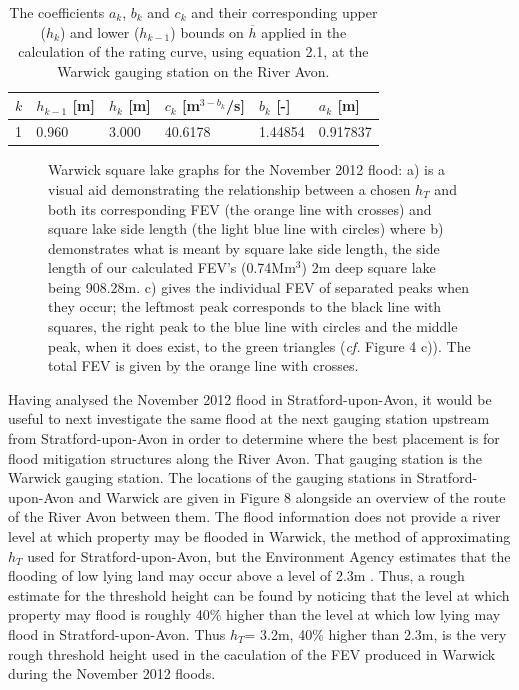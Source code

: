 \documentclass[11pt,a4paper]{article}
\begin{document}
\begin{table}[ht!]
\centering
\begin{tabular}{l|l|l|l|l|l}
$k$ & $h_{k-1}$ [m] & $h_k$ [m] & $c_k$ [m$^{3-b_k}$/s] & $b_k$ [-] & $a_k$ [m]\\
\hline
1 & 0.960 & 3.000 & 40.6178 & 1.44854 & 0.917837 \\
\end{tabular}
\caption{The coefficients $a_k$, $b_k$ and $c_k$ and their corresponding upper ($h_k$) and lower ($h_{k-1}$) bounds on $\overline{h}$ \cite{EA} applied in the calculation of the rating curve, using equation 2.1, at the Warwick gauging station on the River Avon.}
\end{table}

\begin{figure}[ht!]
\centering
{}
\hfill
{}
\caption{Warwick square lake graphs for the November 2012 flood: a) is a visual aid demonstrating the relationship between a chosen $h_T$ and both its corresponding FEV (the orange line with crosses) and square lake side length (the light blue line with circles) where b) demonstrates what is meant by square lake side length, the side length of our calculated FEV's (0.74Mm$^3$) 2m deep square lake being 908.28m. c) gives the individual FEV of separated peaks when they occur{;} the leftmost peak corresponds to the black line with squares, the right peak to the blue line with circles and the middle peak, when it does exist, to the green triangles (\textit{cf.} Figure 4 c)). The total FEV is given by the orange line with crosses.}
\end{figure}

\noindent Having analysed the November 2012 flood in Stratford-upon-Avon, it would be useful to next investigate the same flood at the next gauging station upstream from Stratford-upon-Avon in order to determine where the best placement is for flood mitigation structures along the River Avon. That gauging station is the Warwick gauging station. The locations of the gauging stations in Stratford-upon-Avon and Warwick are given in Figure 8 alongside an overview of the route of the River Avon between them. The flood information does not provide a river level at which property may be flooded in Warwick, the method of approximating $h_T$ used for Stratford-upon-Avon, but the Environment Agency estimates that the flooding of low lying land may occur above a level of 2.3m \cite{EA}. Thus, a rough estimate for the threshold height can be found by noticing that the level at which property may flood is roughly 40\% higher than the level at which low lying may flood in Stratford-upon-Avon. Thus $h_T$= 3.2m, 40\% higher than 2.3m, is the very rough threshold height used in the caculation of the FEV produced in Warwick during the November 2012 floods.
\end{document}
